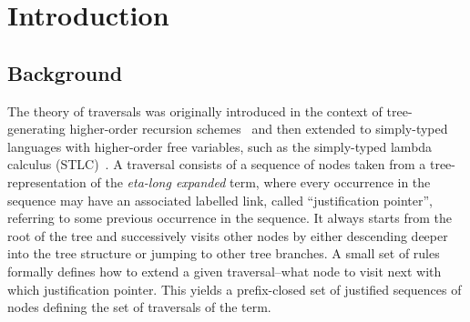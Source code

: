 \documentclass[xchauthor,chkrefs,GCNS,amsmath,amsthm,rotating,leaveRGB]{tcsg}
\theoremstyle{plain}
\theoremstyle{definition}
\begin{document}
\begin{frontmatter}
\begin{abstract}[class=author-highlights,title=Highlights]
\begin{itemize}
    eta-
\item The traversal does not involve the traditional substitution from
    lambda-
\item The procedure can be viewed as an implementation of head linear
\item The procedure terminates and yields the normal form if it
\end{itemize}
\end{abstract}
%
%
%
\begin{keyword}  %
\end{keyword}
\end{frontmatter}



\section{Introduction}\label{sec1}

\subsection{Background}\label{sec1.1}

The theory of traversals was originally introduced in the context of
tree-generating higher-order recursion schemes~\cite{OngLics2006} and then
extended to simply-typed languages with higher-order free variables, such as
the simply-typed lambda calculus (STLC)~\cite{BlumPhd}. A traversal consists
of a sequence of nodes taken from a tree-representation of the \emph{eta-long
expanded} term, where every occurrence in the sequence may have an associated
labelled link, called ``justification pointer'', referring to some previous
occurrence in the sequence. It always starts from the root of the tree and
successively visits other nodes by either descending deeper into the tree
structure or jumping to other tree branches. A small set of rules formally
defines how to extend a given traversal--what node to visit next with which
justification pointer. This yields a prefix-closed set of justified sequences
of nodes defining the set of traversals of the term.
\end{document}
